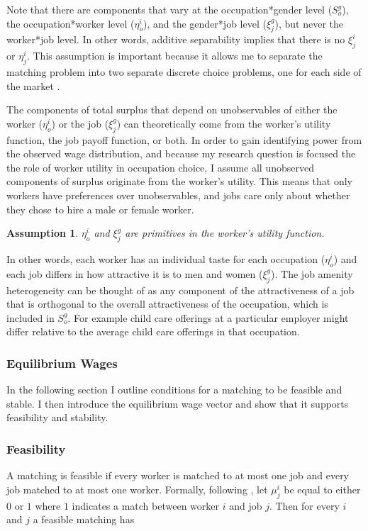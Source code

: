 \documentclass[12pt]{article}
\newtheorem{assumption}{Assumption}
\begin{document}
Note that there are components that vary at the occupation*gender level ($S^g_o$), the occupation*worker level ($\eta^i_o$), and the gender*job level ($\xi^g_j$), but never the worker*job level. In other words, additive separability implies that there is no $\xi^i_j$ or $\eta^i_j$. This assumption is important because it allows me to separate the matching problem into two separate discrete choice problems, one for each side of the market \cite{Galichon2015}.

The components of total surplus that depend on unobservables of either the worker ($\eta^i_o$) or the job ($\xi^g_j$) can theoretically come from the worker's utility function, the job payoff function, or both. In order to gain identifying power from the observed wage distribution, and because my research question is focused the the role of worker utility in occupation choice, I assume all unobserved components of surplus originate from the worker's utility. This means that only workers have preferences over unobservables, and jobs care only about whether they chose to hire a male or female worker.

\begin{assumption}
$\eta^i_o$ and $\xi^g_j$ are primitives in the worker's utility function.
\end{assumption}

In other words, each worker has an individual taste for each occupation ($\eta^i_o$) and each job differs in how attractive it is to men and women ($\xi^g_j$). The job amenity heterogeneity can be thought of as any component of the attractiveness of a job that is orthogonal to the overall attractiveness of the occupation, which is included in $S^g_o$. For example child care offerings at a particular employer might differ relative to the average child care offerings in that occupation.


\subsubsection{Equilibrium Wages} \label{equilibrium}
In the following section I outline conditions for a matching to be feasible and stable. I then introduce the equilibrium wage vector and show that it supports feasibility and stability.

\subsubsection{Feasibility}
A matching is feasible if every worker is matched to at most one job and every job matched to at most one worker. Formally, following , let $\mu^i_j$ be equal to either $0$ or $1$ where $1$ indicates a match between worker $i$ and job $j$. Then for every $i$ and $j$ a feasible matching has
\end{document}
